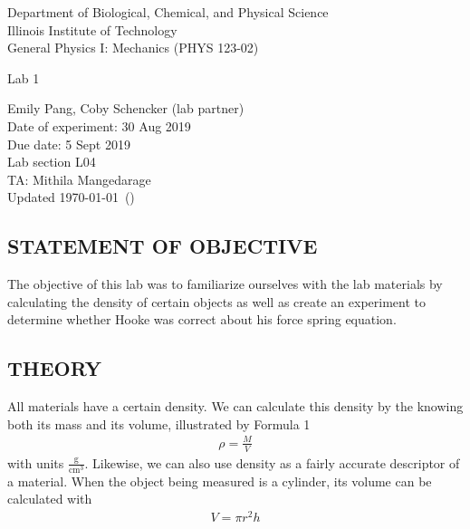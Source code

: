 \documentclass [12pt, letterpaper, twoside] {article}
\begin{document}
\begin {titlepage}
\begin {center}
Department of Biological, Chemical, and Physical Science\\
\vspace {0.1cm}
Illinois Institute of Technology\\
\vspace {0.1cm}
General Physics I: Mechanics (PHYS 123-02)\\
\vspace* {\fill}
\begingroup
\Large
\textbf {}
\vspace {0.35cm}

\normalsize
Lab 1
\vspace {1.5cm}
\endgroup
\vspace* {\fill}
\end {center}

\vspace*{\fill}
\begin {flushright}
\footnotesize
Emily Pang, Coby Schencker (lab partner)\\
Date of experiment: 30 Aug 2019\\
Due date: 5 Sept 2019\\
Lab section L04\\
TA: Mithila Mangedarage\\
Updated \usdate\today~(\currenttime)
\end {flushright}
\end {titlepage}
\subsection* {STATEMENT OF OBJECTIVE}
The objective of this lab was to familiarize ourselves with the lab materials by calculating the density of certain objects as well as create an experiment to determine whether Hooke was correct about his force spring equation.\\

\subsection* {THEORY}
\noindent
All materials have a certain density. We can calculate this density by the knowing both its mass and its volume, illustrated by Formula 1
\begin {equation}
  \begin {split}
    \rho=\tfrac{M}{V}
  \end {split}
\end {equation}
with units \(\tfrac{\text{g}}{\text{cm}^3}\). Likewise, we can also use density as a fairly accurate descriptor of a material. When the object being measured is a cylinder, its volume can be calculated with
\begin {equation}
  \begin {split}
    V=\pi{}r^2h
  \end {split}
\end {equation}
\end{document}

